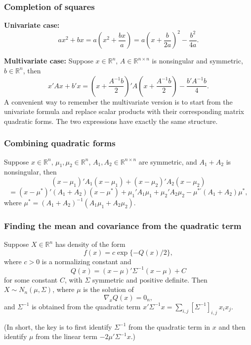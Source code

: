 \documentclass{article}
\theoremstyle{break}
\newcommand{\R}{\ensuremath{\mathbb{R}}}
\begin{document}
\subsubsection{Completion of squares}
\textbf{Univariate case:}
\[
ax^2 + bx 
= a\left(x^2 + \frac{bx}{a}\right) 
= a\left(x + \frac{b}{2a}\right)^2 - \frac{b^2}{4a}.
\]

\textbf{Multivariate case:}
Suppose $x \in \R^n$, $A \in \R^{n \times n}$ is nonsingular and symmetric, $b \in \R^n$, then
\[
x' A x + b' x 
= \left(x + \frac{A^{-1} b}{2}\right)' A \left(x + \frac{A^{-1} b}{2}\right) - \frac{b' A^{-1} b}{4}.
\]
A convenient way to remember the multivariate version is to start from the univariate formula and replace scalar products with their corresponding matrix quadratic forms. The two expressions have exactly the same structure.

\subsubsection{Combining quadratic forms}
Suppose $x \in \R^n$, $\mu_1, \mu_2 \in \R^n$, $A_1, A_2 \in \R^{n \times n}$ are symmetric, and $A_1 + A_2$ is nonsingular, then
\[
(x - \mu_1)' A_1 (x - \mu_1) + (x - \mu_2)' A_2 (x - \mu_2)
\]
\[
= (x - \mu^*)' (A_1 + A_2) (x - \mu^*) 
+ \mu_1' A_1 \mu_1 + \mu_2' A_2 \mu_2 
- \mu^{*'} (A_1 + A_2) \mu^*,
\]
where $\mu^* = (A_1 + A_2)^{-1}(A_1 \mu_1 + A_2 \mu_2)$.

\subsubsection{Finding the mean and covariance from the quadratic term}
Suppose $X \in \R^n$ has density of the form 
\[
f(x) = c \exp\{-Q(x)/2\},
\]
where $c>0$ is a normalizing constant and
\[
Q(x)=(x-\mu)'\Sigma^{-1}(x-\mu) + C
\] 
for some constant $C$, with $\Sigma$ symmetric and positive definite.
Then $X \sim N_n(\mu, \Sigma)$, where $\mu$ is the solution of 
\[
\nabla_x Q(x) = 0_n,
\]
and $\Sigma^{-1}$ is obtained from the quadratic term $x' \Sigma^{-1} x = \sum_{i,j} [\Sigma^{-1}]_{i,j}\ x_i x_j$.

(In short, the key is to first identify $\Sigma^{-1}$ from the quadratic term in $x$ and then identify $\mu$ from the linear term $-2\mu'\Sigma^{-1}x$.)


\end{document}

